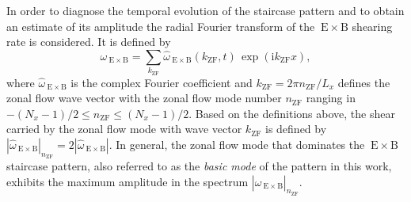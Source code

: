 \documentclass[aip, amsmath, amssymb, reprint, twocolumn, floatfix]{revtex4-1}
\newcommand{\wexb}{\omega_{\mathrm{\:E \times B}}}
\newcommand{\hatwexb}{\widehat{\omega}_{\mathrm{\:E \times B}}}
\newcommand{\exb}{\mathrm{\:E}\times\mathrm{B}}
\newcommand{\hatwexbamp}{|\hatwexb|_{\nzf}}
\newcommand{\nzf}{n_\mathrm{ZF}}
\newcommand{\kzf}{k_\mathrm{ZF}}
\newcommand{\xcoord}{x}
\begin{document}
In order to diagnose the temporal evolution of the staircase pattern and to obtain an estimate of its amplitude the radial Fourier transform of the $\exb$ shearing rate is considered. 
It is defined by
\begin{equation}
	\wexb = \sum_{\kzf} \hatwexb(\kzf,t) \, \exp(\mathrm{i} \kzf \xcoord),
	\label{eq:shearingrate_fourier}
\end{equation}
where $\hatwexb$ is the complex Fourier coefficient and \linebreak $\kzf = 2\pi \nzf/L_\xcoord$
defines the zonal flow wave vector with the zonal flow mode number $\nzf$ ranging in $-(N_\xcoord -1)/2 \leq \nzf \leq (N_\xcoord -1)/2 $.
Based on the definitions above, the shear carried by the zonal flow mode with wave vector $\kzf$ is defined by $\hatwexbamp = 2 |\hatwexb|$. 
In general, the zonal flow mode that dominates the $\exb$ staircase pattern, also referred to as the \textit{basic mode} of the pattern in this work, exhibits the maximum amplitude in the spectrum $\hatwexbamp$. \bigskip



\end{document}
